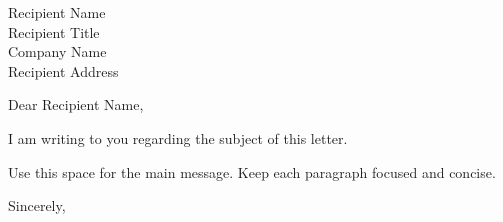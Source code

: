 \documentclass[11pt]{letter}
\begin{document}
\begin{letter}{Recipient Name \\ Recipient Title \\ Company Name \\ Recipient Address}

\opening{Dear Recipient Name,}

I am writing to you regarding the subject of this letter.

Use this space for the main message. Keep each paragraph focused and concise.

\closing{Sincerely,}

\end{letter}
\end{document}
